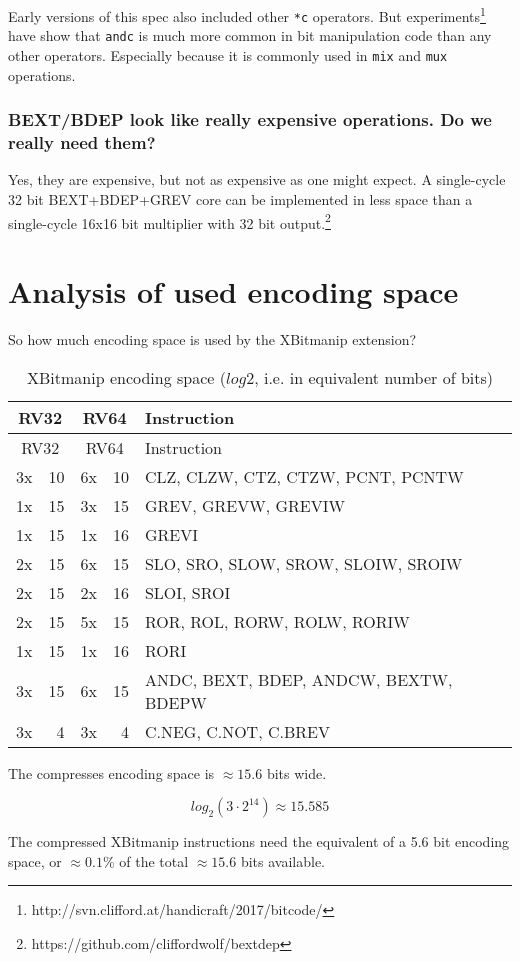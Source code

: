 Early versions of this spec also included other \texttt{*c} operators. But
experiments\footnote{http://svn.clifford.at/handicraft/2017/bitcode/} have show that
\texttt{andc} is much more common in bit manipulation code than any other operators.
Especially because it is commonly used in \texttt{mix} and \texttt{mux} operations.

\subsubsection{BEXT/BDEP look like really expensive operations. Do we really need them?}

Yes, they are expensive, but not as expensive as one might expect. A
single-cycle 32 bit BEXT+BDEP+GREV core can be implemented in less space than a
single-cycle 16x16 bit multiplier with 32 bit output.\footnote{https://github.com/cliffordwolf/bextdep}

\section{Analysis of used encoding space}

So how much encoding space is used by the XBitmanip extension?

\begin{longtable}[c]{@{}rr|rr|l@{}}
\caption{XBitmanip encoding space ($log2$, i.e. in equivalent number of bits)}\tabularnewline
\toprule
\multicolumn{2}{c}{RV32} & \multicolumn{2}{c}{RV64} & Instruction\tabularnewline
\midrule
\endfirsthead
\toprule
\multicolumn{2}{c}{RV32} & \multicolumn{2}{c}{RV64} & Instruction\tabularnewline
\midrule
\endhead
3x & 10 & 6x & 10 & CLZ, CLZW, CTZ, CTZW, PCNT, PCNTW\tabularnewline
\midrule
1x & 15 & 3x & 15 & GREV, GREVW, GREVIW\tabularnewline
1x & 15 & 1x & 16 & GREVI\tabularnewline
\midrule
2x & 15 & 6x & 15 & SLO, SRO, SLOW, SROW, SLOIW, SROIW\tabularnewline
2x & 15 & 2x & 16 & SLOI, SROI\tabularnewline
\midrule
2x & 15 & 5x & 15 & ROR, ROL, RORW, ROLW, RORIW\tabularnewline
1x & 15 & 1x & 16 & RORI\tabularnewline
\midrule
3x & 15 & 6x & 15 & ANDC, BEXT, BDEP, ANDCW, BEXTW, BDEPW\tabularnewline
\midrule
3x &  4 & 3x &  4 & C.NEG, C.NOT, C.BREV\tabularnewline
\bottomrule
\end{longtable}

The compresses encoding space is $\approx 15.6$ bits wide.

$$ log_2(3 \cdot 2^{14}) \approx 15.585 $$

The compressed XBitmanip instructions need the equivalent of a 5.6 bit
encoding space, or $\approx 0.1\%$ of the total $\approx 15.6$ bits available.

